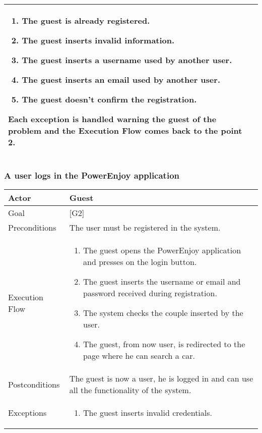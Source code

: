 \documentclass{article}
\begin{document}
\begin{tabularx}{\textwidth}{  l  X  }
\begin{enumerate}
			 \item{The guest is already registered.}
					 			 \item{The guest inserts invalid information.}
					 		   \item{The guest inserts a username used by another user.}
					 		   \item{The guest inserts an email used by another user.}
					 		 	 \item{The guest doesn't confirm the registration.}
					 		 \end{enumerate}
					 Each exception is handled warning the guest of the problem and the Execution Flow comes back to the point 2.\\
		\hline
	\end{tabularx}

	\subsubsection{A user logs in the PowerEnjoy application}
	\begin{tabularx}{\textwidth}{  l  X  }
		\hline
		Actor & Guest\\
		\hline
		Goal & [G2]\\
		\hline
		Preconditions & The user must be registered in the system.\\
		\hline
		Execution Flow & \begin{enumerate}
			\item{The guest opens the PowerEnjoy application and presses on the login button.}
										 \item{The guest inserts the username or email and password received during registration.}
										 \item{The system checks the couple inserted by the user.}
										 \item{The guest, from now user, is redirected to the page where he can search a car.}
										\end{enumerate}\\
		\hline
		Postconditions & The guest is now a user, he is logged in and can use all the functionality of the system.\\
		\hline
		Exceptions & \begin{enumerate} 
			\item{The guest inserts invalid credentials.}
			\end{enumerate}\\
		\hline
	\end{tabularx}
\end{document}
